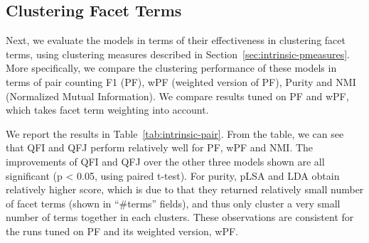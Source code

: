 \subsection{Clustering Facet Terms}
Next, we evaluate the models in terms of their effectiveness in clustering facet terms, using clustering measures described in Section~\ref{sec:intrinsic-pmeasures}. More specifically, we compare the clustering performance of these models in terms of pair counting F1 (PF), wPF (weighted version of PF), Purity and NMI (Normalized Mutual Information). We compare results tuned on PF  and wPF, which takes facet term weighting into account.

We report the results in Table~\ref{tab:intrinsic-pair}. From the table, we can see that QFI and QFJ perform relatively well for PF, wPF and NMI. The improvements of QFI and QFJ over the other three models shown are all significant (p < 0.05, using paired t-test). For purity, pLSA and LDA obtain relatively higher score, which is due to that they returned relatively small number of facet terms (shown in ``\#terms'' fields), and thus only cluster a very small number of terms together in each clusters.  These observations are consistent for the runs tuned on PF and its weighted version, wPF.


